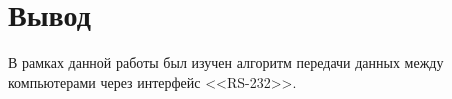 \chapter{Вывод}

В рамках данной работы был изучен алгоритм передачи данных между компьютерами через интерфейс <<RS-232>>.

